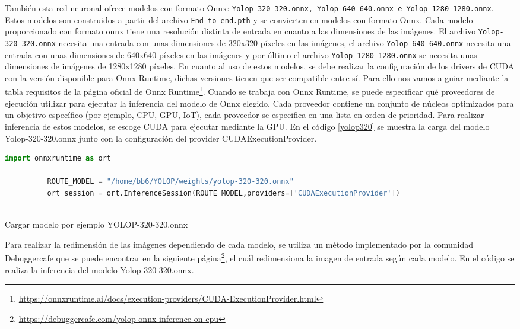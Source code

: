       También esta red neuronal ofrece modelos con formato Onnx: \texttt{Yolop-320-320.onnx, Yolop-640-640.onnx e Yolop-1280-1280.onnx}. Estos modelos son construidos a partir del archivo 
      \texttt{End-to-end.pth} y se convierten en modelos con formato Onnx. Cada modelo proporcionado con formato onnx tiene una resolución distinta de entrada en cuanto a las dimensiones
      de las imágenes. El archivo \texttt{Yolop-320-320.onnx} necesita una entrada con unas dimensiones de 320x320 píxeles en las imágenes, el archivo \texttt{Yolop-640-640.onnx} necesita 
      una entrada con unas dimensiones de 640x640 píxeles en las imágenes y por último el archivo \texttt{Yolop-1280-1280.onnx} se necesita unas dimensiones de imágenes de 1280x1280 píxeles. 
      En cuanto al uso de estos modelos, se debe realizar la configuración de los drivers de CUDA con la versión disponible para Onnx Runtime, 
      dichas versiones tienen que ser compatible entre sí. Para ello nos vamos a guiar mediante la tabla requisitos de la página oficial de Onnx Runtime\footnote{\url{https://onnxruntime.ai/docs/execution-providers/CUDA-ExecutionProvider.html}}. \newline
      Cuando se trabaja con Onnx Runtime, se puede especificar qué proveedores de ejecución utilizar para ejecutar la inferencia del modelo de Onnx elegido. Cada proveedor 
      contiene un conjunto de núcleos optimizados para un objetivo específico (por ejemplo, CPU, GPU, IoT), cada proveedor se especifica en una lista en orden de prioridad. Para realizar 
      inferencia de estos modelos, se escoge CUDA para ejecutar mediante la GPU. En el código \ref{yolop320} se muestra la carga del modelo Yolop-320-320.onnx junto con la configuración
      del provider CUDAExecutionProvider. 
      
      \begin{code}[h]
        \begin{lstlisting}[language=Python]
          import onnxruntime as ort

          ROUTE_MODEL = "/home/bb6/YOLOP/weights/yolop-320-320.onnx"
          ort_session = ort.InferenceSession(ROUTE_MODEL,providers=['CUDAExecutionProvider'])
      
        \end{lstlisting}
        \caption[Cargar modelo]{Cargar modelo por ejemplo YOLOP-320-320.onnx}
        \label{yolop320}
        \end{code}  

        Para realizar la redimensión de las imágenes dependiendo de cada modelo, se utiliza un método implementado por la comunidad Debuggercafe 
        que se puede encontrar en la siguiente página\footnote{\url{https://debuggercafe.com/yolop-onnx-inference-on-cpu}}, el cuál redimensiona la imagen de entrada según cada modelo. En el código 
        \label{cod:Inferencia_onnx} se realiza la inferencia del modelo Yolop-320-320.onnx. 

